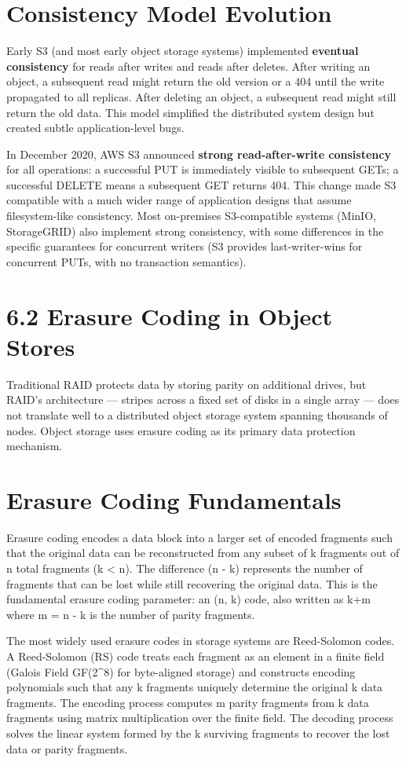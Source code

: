 \section{Consistency Model Evolution}
Early S3 (and most early object storage systems) implemented \textbf{eventual consistency} for reads after writes and reads after deletes. After writing an object, a subsequent read might return the old version or a 404 until the write propagated to all replicas. After deleting an object, a subsequent read might still return the old data. This model simplified the distributed system design but created subtle application-level bugs.

In December 2020, AWS S3 announced \textbf{strong read-after-write consistency} for all operations: a successful PUT is immediately visible to subsequent GETs; a successful DELETE means a subsequent GET returns 404. This change made S3 compatible with a much wider range of application designs that assume filesystem-like consistency. Most on-premises S3-compatible systems (MinIO, StorageGRID) also implement strong consistency, with some differences in the specific guarantees for concurrent writers (S3 provides last-writer-wins for concurrent PUTs, with no transaction semantics).

\section{6.2 Erasure Coding in Object Stores}
Traditional RAID protects data by storing parity on additional drives, but RAID's architecture --- stripes across a fixed set of disks in a single array --- does not translate well to a distributed object storage system spanning thousands of nodes. Object storage uses erasure coding as its primary data protection mechanism.

\section{Erasure Coding Fundamentals}
Erasure coding encodes a data block into a larger set of encoded fragments such that the original data can be reconstructed from any subset of k fragments out of n total fragments (k \textless{} n). The difference (n - k) represents the number of fragments that can be lost while still recovering the original data. This is the fundamental erasure coding parameter: an (n, k) code, also written as k+m where m = n - k is the number of parity fragments.

The most widely used erasure codes in storage systems are Reed-Solomon codes. A Reed-Solomon (RS) code treats each fragment as an element in a finite field (Galois Field GF(2\^{}8) for byte-aligned storage) and constructs encoding polynomials such that any k fragments uniquely determine the original k data fragments. The encoding process computes m parity fragments from k data fragments using matrix multiplication over the finite field. The decoding process solves the linear system formed by the k surviving fragments to recover the lost data or parity fragments.

